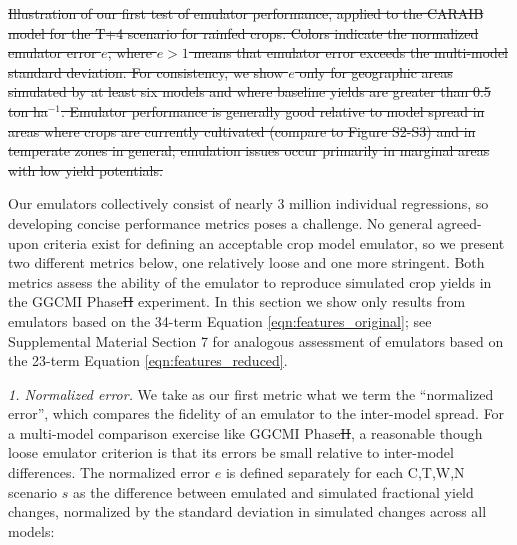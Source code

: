 \documentclass[gmdd]{copernicus} %
\providecommand{\DIFadd}[1]{{\protect\color{blue}\uwave{#1}}} %
\providecommand{\DIFdel}[1]{{\protect\color{red}\sout{#1}}}                      %
\providecommand{\DIFaddbegin}{} %
\providecommand{\DIFaddend}{} %
\providecommand{\DIFdelbegin}{} %
\providecommand{\DIFdelend}{} %
\providecommand{\DIFdelFL}[1]{\DIFdel{#1}} %
\begin{document}
\DIFdelbegin %
{%
\DIFdelFL{Illustration of our first test of emulator performance, applied to the CARAIB model for the T+4 scenario for rainfed crops. 
    Colors indicate the normalized emulator error $e$, where $e > 1$ means that emulator error exceeds the multi-model standard deviation. 
    For consistency, we show $e$ only for geographic areas simulated by at least six models and where baseline yields are greater than 0.5 ton ha$^{-1}$.
    Emulator performance is generally good relative to model spread in areas where crops are currently cultivated (compare to Figure S2-S3) and in temperate zones in general; emulation issues occur primarily in marginal areas with low yield potentials. 
    }}

\DIFdelend Our emulators collectively consist of nearly 3 million individual regressions, so developing concise performance metrics poses a challenge.
No general agreed-upon criteria exist for defining an acceptable crop model emulator, so we present two different metrics below, one relatively loose and one more stringent.  
Both metrics assess the ability of the emulator to reproduce simulated crop yields in the GGCMI Phase\DIFdelbegin \DIFdel{II }\DIFdelend \DIFaddbegin \DIFadd{~2 }\DIFaddend experiment. 
In this section we show only results from emulators based on the 34-term Equation \ref{eqn:features_original};
see Supplemental Material Section 7 for analogous assessment of emulators based on the 23-term Equation \ref{eqn:features_reduced}.

\smallskip
\textit{1. Normalized error.} 
We take as our first metric what we term the ``normalized error'', which compares the fidelity of an emulator to the inter-model spread. 
For a multi-model comparison exercise like GGCMI Phase\DIFdelbegin \DIFdel{II}\DIFdelend \DIFaddbegin \DIFadd{~2}\DIFaddend , a reasonable though loose emulator criterion is that its errors be small relative to inter-model differences. The normalized error $e$ is defined separately for each C,T,W,N scenario $s$ as the difference between emulated and simulated fractional yield changes, normalized by the standard deviation in simulated changes across all models: 
\end{document}
